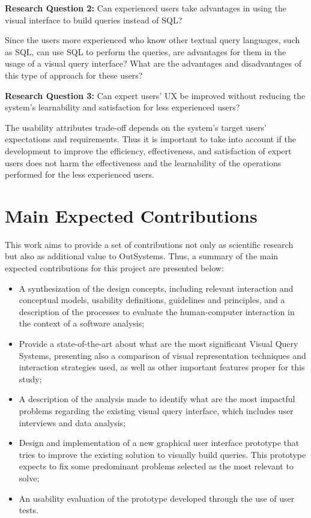 \medskip

\textbf{Research Question 2:} Can experienced users take advantages in using the visual interface to build queries instead of SQL?

\medskip

Since the users more experienced who know other textual query languages, such as SQL, can use SQL to perform the queries, are advantages for them in the usage of a visual query interface? What are the advantages and disadvantages of this type of approach for these users?

\medskip

\textbf{Research Question 3:} Can expert users' UX be improved without reducing the system's learnability and satisfaction for less experienced users?


\medskip

The usability attributes trade-off depends on the system's target users' expectations and requirements. Thus it is important to take into account if the development to improve the efficiency, effectiveness, and satisfaction of expert users does not harm the effectiveness and the learnability of the operations performed for the less experienced users.

\section{Main Expected Contributions}
\label{sec:main_exp_contributions}
This work aims to provide a set of contributions not only as scientific research but also as additional value to OutSystems. Thus, a summary of the main expected contributions for this project are presented below:

\begin{itemize}
  \item A synthesization of the design concepts, including relevant interaction and conceptual models, usability definitions, guidelines and principles, and a description of the processes to evaluate the human-computer interaction in the context of a software analysis;
  \item Provide a state-of-the-art about what are the most significant Visual Query Systems, presenting also a comparison of visual representation techniques and interaction strategies used, as well as other important features proper for this study;
  \item A description of the analysis made to identify what are the most impactful problems regarding the existing visual query interface, which includes user interviews and data analysis;
  \item Design and implementation of a new graphical user interface prototype that tries to improve the existing solution to visually build queries. This prototype expects to fix some predominant problems selected as the most relevant to solve;
  \item An usability evaluation of the prototype developed through the use of user tests.
\end{itemize} 

